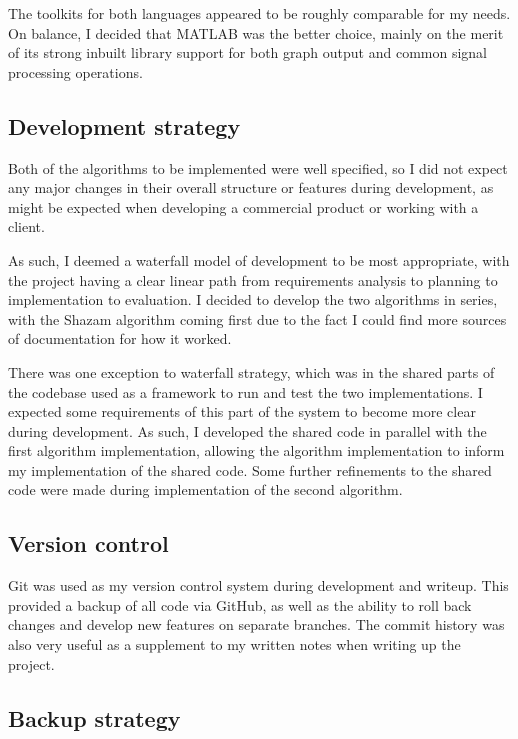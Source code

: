 \documentclass[12pt,a4paper,twoside,openright]{report}
\begin{document}
The toolkits for both languages appeared to be roughly comparable for my needs. On balance, I decided that MATLAB was the better choice, mainly on the merit of its strong inbuilt library support for both graph output and common signal processing operations.


\subsection{Development strategy}
\label{section:devstrat}

Both of the algorithms to be implemented were well specified, so I did not expect any major changes in their overall structure or features during development, as might be expected when developing a commercial product or working with a client. 

As such, I deemed a waterfall model of development to be most appropriate, with the project having a clear linear path from requirements analysis to planning to implementation to evaluation. I decided to develop the two algorithms in series, with the Shazam algorithm coming first due to the fact I could find more sources of documentation for how it worked.

There was one exception to waterfall strategy, which was in the shared parts of the codebase used as a framework to run and test the two implementations. I expected some requirements of this part of the system to become more clear during development. As such, I developed the shared code in parallel with the first algorithm implementation, allowing the algorithm implementation to inform my implementation of the shared code. Some further refinements to the shared code were made during implementation of the second algorithm.


\subsection{Version control}

Git was used as my version control system during development and writeup. This provided a backup of all code via GitHub, as well as the ability to roll back changes and develop new features on separate branches. The commit history was also very useful as a supplement to my written notes when writing up the project.


\subsection{Backup strategy}
\end{document}
